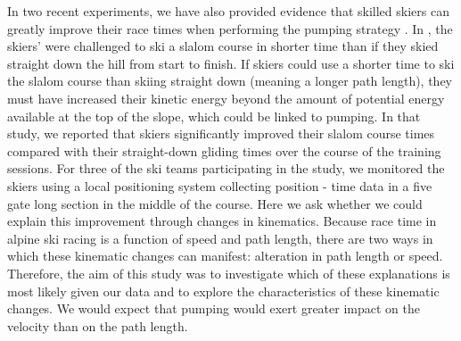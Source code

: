 \documentclass{article}
\begin{document}
In two recent experiments, we have also provided evidence that skilled skiers can greatly improve their race times when performing the pumping strategy   \cite{magelssen_is_2022, christian_magelssen_reinforcement_2024}. In \textcite{magelssen_is_2022}, the skiers' were challenged to ski a slalom course in shorter time than if they skied straight down the hill from start to finish. If skiers could use a shorter time to ski the slalom course than  skiing straight down (meaning a longer path length), they must have increased their kinetic energy beyond the amount of potential energy available at the top of the slope, which could be linked to pumping. In that study, we reported that  skiers significantly improved their slalom course times compared with their straight-down gliding times over the course of the training sessions. For three of the ski teams participating in the study, we monitored the skiers using a local positioning system collecting position - time data in a five gate long section in the middle of the course. Here we ask whether we could explain this improvement through changes in kinematics. Because race time in alpine ski racing is a function of speed and path length, there are two ways in which these kinematic changes can manifest: alteration in path length or  speed. Therefore, the aim of this study was to investigate which of these explanations is most likely given our data and to explore the characteristics of these kinematic changes. We would expect that pumping would exert greater impact on the velocity than on the path length.

\end{document}
